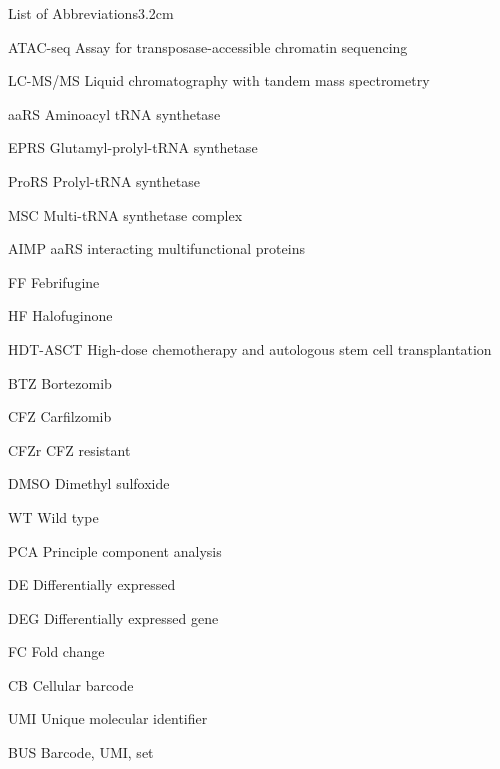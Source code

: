 \begin{mclistof}{List of Abbreviations}{3.2cm}
\item[ATAC-seq] Assay for transposase-accessible chromatin sequencing

\item[LC-MS/MS] Liquid chromatography with tandem mass spectrometry

\item[aaRS] Aminoacyl tRNA synthetase

\item[EPRS] Glutamyl-prolyl-tRNA synthetase

\item[ProRS] Prolyl-tRNA synthetase

\item[MSC] Multi-tRNA synthetase complex

\item[AIMP] aaRS interacting multifunctional proteins

\item[FF] Febrifugine

\item[HF] Halofuginone

\item[HDT-ASCT] High-dose chemotherapy and autologous stem cell transplantation

\item[BTZ] Bortezomib

\item[CFZ] Carfilzomib

\item[CFZr] CFZ resistant

\item[DMSO] Dimethyl sulfoxide

\item[WT] Wild type

\item[PCA] Principle component analysis

\item[DE] Differentially expressed

\item[DEG] Differentially expressed gene

\item[FC] Fold change

\item[CB] Cellular barcode

\item[UMI] Unique molecular identifier

\item[BUS] Barcode, UMI, set


\end{mclistof}
